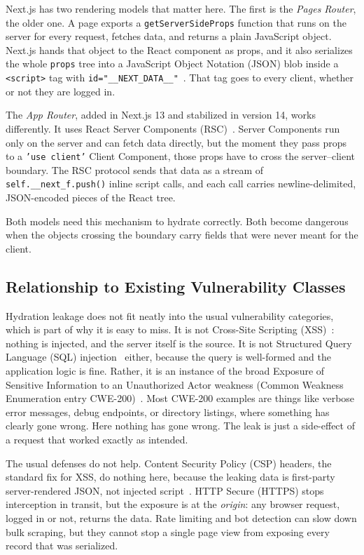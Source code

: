 \documentclass[runningheads]{llncs}
\begin{document}
Next.js has two rendering models that matter here.  The first is the
\emph{Pages Router}, the older one.  A page exports a
\texttt{getServerSideProps} function that runs on the server for every
request, fetches data, and returns a plain JavaScript object.  Next.js
hands that object to the React component as props, and it also serializes
the whole \texttt{props} tree into a JavaScript Object Notation (JSON)
blob inside a \texttt{<script>} tag with
\texttt{id="\_\_NEXT\_DATA\_\_"}~\cite{next16docs}.  That tag goes to
every client, whether or not they are logged in.

The \emph{App Router}, added in Next.js 13 and stabilized in version 14,
works differently.  It uses React Server Components (RSC)~\cite{rsc2023}.
Server Components run only on the server and can fetch data directly, but
the moment they pass props to a \texttt{'use client'} Client Component,
those props have to cross the server--client boundary.  The RSC protocol
sends that data as a stream of \texttt{self.\_\_next\_f.push()} inline
script calls, and each call carries newline-delimited, JSON-encoded pieces
of the React tree.

Both models need this mechanism to hydrate correctly.  Both become
dangerous when the objects crossing the boundary carry fields that were
never meant for the client.

\subsection{Relationship to Existing Vulnerability Classes}

Hydration leakage does not fit neatly into the usual vulnerability
categories, which is part of why it is easy to miss.  It is not
Cross-Site Scripting (XSS)~\cite{owasp_xss,lekies2013}: nothing is
injected, and the server itself is the source.  It is not Structured
Query Language (SQL) injection~\cite{owasp_sqli} either, because the query
is well-formed and the application logic is fine.  Rather, it is an
instance of the broad Exposure of Sensitive Information to an Unauthorized
Actor weakness (Common Weakness Enumeration entry CWE-200)~\cite{cwe200}.
Most CWE-200 examples are things like verbose error messages, debug
endpoints, or directory listings, where something has clearly gone wrong.
Here nothing has gone wrong.  The leak is just a side-effect of a request
that worked exactly as intended.

The usual defenses do not help.  Content Security Policy (CSP) headers,
the standard fix for XSS, do nothing here, because the leaking data is
first-party server-rendered JSON, not injected script~\cite{csp_mdn}.
HTTP Secure (HTTPS) stops interception in transit, but the exposure is at
the \emph{origin}: any browser request, logged in or not, returns the
data.  Rate limiting and bot detection can slow down bulk scraping, but
they cannot stop a single page view from exposing every record that was
serialized.
\end{document}
